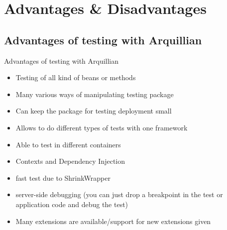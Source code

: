 \section[Advantages \& Disadvantages]{Advantages \& Disadvantages}
\subsection{Advantages of testing with Arquillian}
\begin{frame}{Advantages of testing with Arquillian}
  \begin{itemize}
  \item Testing of all kind of beans or methods
  \item Many various ways of manipulating testing package
  \item Can keep the package for testing deployment small
  \item Allows to do different types of tests with one framework
  \item Able to test in different containers
  \item Contexts and Dependency Injection 
  \item fast test due to ShrinkWrapper
  \item server-side debugging (you can just drop a breakpoint in the test or 			application code and debug the test)
  \item Many extensions are available/support for new extensions given
  \end{itemize}
\end{frame}

